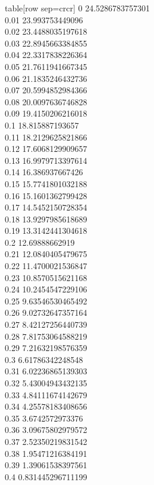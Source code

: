   table[row sep=crcr]{%
0	24.5286783757301\\
0.01	23.993753449096\\
0.02	23.4488035197618\\
0.03	22.8945663384855\\
0.04	22.3317838226364\\
0.05	21.7611941667345\\
0.06	21.1835246432736\\
0.07	20.5994852984366\\
0.08	20.0097636746828\\
0.09	19.4150206216018\\
0.1	18.815887193657\\
0.11	18.2129625821866\\
0.12	17.6068129909657\\
0.13	16.9979713397614\\
0.14	16.386937667426\\
0.15	15.7741801032188\\
0.16	15.1601362799428\\
0.17	14.5452150728354\\
0.18	13.9297985618689\\
0.19	13.3142441304618\\
0.2	12.69888662919\\
0.21	12.0840405479675\\
0.22	11.4700021536847\\
0.23	10.8570515621168\\
0.24	10.2454547229106\\
0.25	9.63546530465492\\
0.26	9.02732647357164\\
0.27	8.42127256440739\\
0.28	7.81753064588219\\
0.29	7.21632198576359\\
0.3	6.61786342248548\\
0.31	6.02236865139303\\
0.32	5.43004943432135\\
0.33	4.84111674142679\\
0.34	4.25578183408656\\
0.35	3.6742572973376\\
0.36	3.09675802979572\\
0.37	2.52350219831542\\
0.38	1.95471216384191\\
0.39	1.39061538397561\\
0.4	0.831445296711199\\
}
